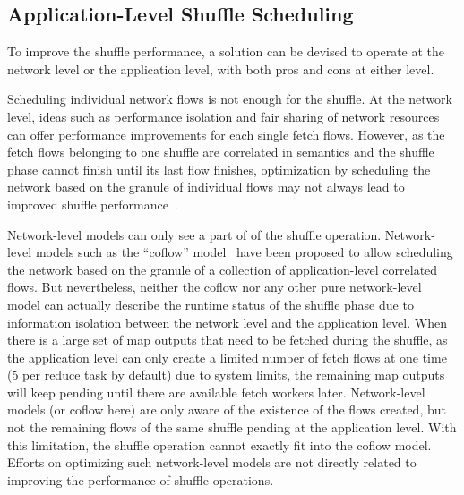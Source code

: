 \documentclass[10pt,journal,compsoc]{IEEEtran}
\begin{document}
\subsection{Application-Level Shuffle Scheduling}\label{section:application_level}
To improve the shuffle performance, a solution can be devised to operate at the network level or the application level, with both pros and cons
at either level. 

Scheduling individual network flows is not enough for the shuffle. 
At the network level, ideas such as
performance isolation \cite{greenberg2009vl2}
and fair sharing of network resources \cite{shieh2011sharing,popa2012faircloud} 
can offer performance improvements for each single fetch flows.
However, as the fetch flows belonging to one shuffle are correlated in
semantics and the shuffle phase cannot finish until its last flow
finishes, optimization by scheduling the network based on the granule of
individual flows may not always lead to improved shuffle performance~\cite{chowdhury2014efficient}.


Network-level models can only see a part of of the shuffle operation.
Network-level models such as the ``coflow'' model~\cite{chowdhury2014efficient,
chowdhury2015efficient} have been proposed to allow scheduling the network based on
the granule of a collection of application-level correlated flows.
But nevertheless, neither the coflow nor any other pure network-level
model can actually describe the runtime status of the shuffle phase
due to information isolation between the network level and the
application level.
When there is a large set of map outputs that need to be fetched during
the shuffle, as the application level can only create a limited number
of fetch flows at one time (5 per reduce task by default)
due to system limits,
the remaining map outputs will keep pending until there are available
fetch workers later. 
Network-level models (or coflow here) are only aware of the existence of
the flows created, but not the remaining flows of the same shuffle
pending at the application level.
With this limitation, the shuffle operation cannot exactly fit into the coflow model. 
Efforts on optimizing such network-level models are not directly related to 
improving the performance of shuffle operations.
\end{document}

